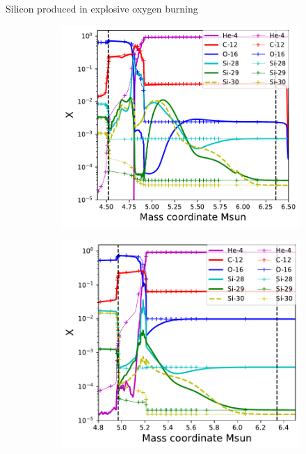 \documentclass[10pt]{beamer}
\begin{document}
\begin{frame}{Silicon produced in explosive oxygen burning}
\begin{figure}
        \begin{subfigure}[b]{0.38\textwidth}
            \includegraphics[width=\textwidth]{figs/200.02.pdf}
        \end{subfigure}
        \begin{subfigure}[b]{0.38\textwidth}
            \includegraphics[width=\textwidth]{figs/200.01.pdf}
        \end{subfigure}
    \end{figure}
    
\end{frame}
\end{document}
